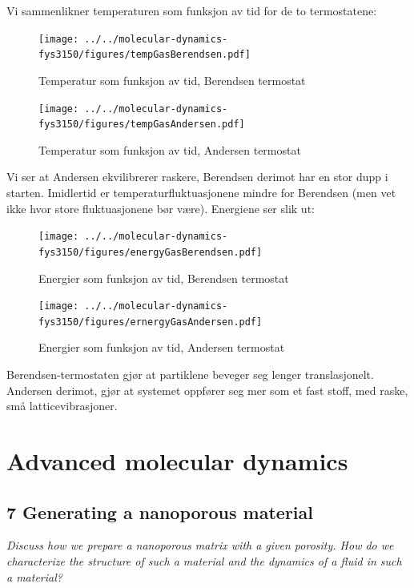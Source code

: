 \documentclass[english, a4paper]{article}
\begin{document}
\noindent
Vi sammenlikner temperaturen som funksjon av tid for de to termostatene:
\begin{figure}[H]
\begin{minipage}[t]{0.48\linewidth}
  \texttt{[image: ../../molecular-dynamics-fys3150/figures/tempGasBerendsen.pdf]}
  \caption{Temperatur som funksjon av tid, Berendsen termostat}
  \label{fig:minipage1}
\end{minipage}
\quad
\begin{minipage}[t]{0.48\linewidth}
\texttt{[image: ../../molecular-dynamics-fys3150/figures/tempGasAndersen.pdf]}
  \caption{Temperatur som funksjon av tid, Andersen termostat}
  \label{fig:minipage1}
\end{minipage}
\end{figure}
Vi ser at Andersen ekvilibrerer raskere, Berendsen derimot har en stor dupp i starten. 
Imidlertid er temperaturfluktuasjonene mindre for Berendsen (men vet ikke hvor store 
fluktuasjonene bør være).
Energiene ser slik ut:
\begin{figure}[H]
\begin{minipage}[t]{0.48\linewidth}
  \texttt{[image: ../../molecular-dynamics-fys3150/figures/energyGasBerendsen.pdf]}
  \caption{Energier som funksjon av tid, Berendsen termostat}
  \label{fig:minipage2}
\end{minipage}
\quad
\begin{minipage}[t]{0.48\linewidth}
\texttt{[image: ../../molecular-dynamics-fys3150/figures/ernergyGasAndersen.pdf]}
  \caption{Energier som funksjon av tid, Andersen termostat}
  \label{fig:minipage2}
\end{minipage}
\end{figure}
Berendsen-termostaten gjør at partiklene beveger seg lenger translasjonelt. Andersen derimot, 
gjør at systemet oppfører seg mer som et fast stoff, med raske, små latticevibrasjoner. 


\section{Advanced molecular dynamics}

\subsection{ 7 Generating a nanoporous material}
\textit{Discuss how we prepare a nanoporous matrix with a given porosity. How do we 
characterize the structure of such a material and the dynamics of a fluid in such a 
material?} \\
\end{document}
